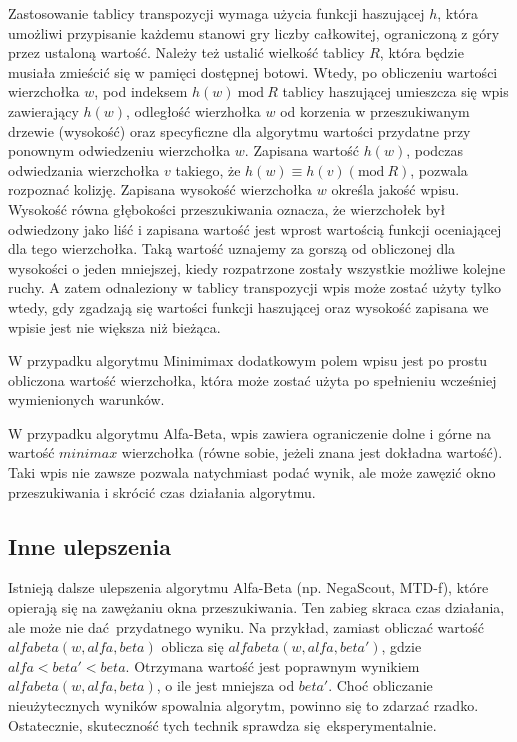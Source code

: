 \documentclass{pracamgr}
\begin{document}
Zastosowanie tablicy transpozycji wymaga użycia funkcji haszującej \(h\), która umożliwi przypisanie każdemu stanowi gry liczby całkowitej, ograniczoną z góry przez ustaloną wartość.
Należy też ustalić wielkość tablicy \(R\), która będzie musiała zmieścić się w pamięci dostępnej botowi.
Wtedy, po obliczeniu wartości wierzchołka \(w\), pod indeksem \(h(w)\ \textrm{mod}\ R\) tablicy haszującej umieszcza się wpis zawierający \(h(w)\), odległość wierzhołka \(w\) od korzenia w przeszukiwanym drzewie (wysokość) oraz specyficzne dla algorytmu wartości przydatne przy ponownym odwiedzeniu wierzchołka \(w\).
Zapisana wartość \(h(w)\), podczas odwiedzania wierzchołka \(v\) takiego, że \(h(w) \equiv h(v) (\textrm{mod}\ R)\), pozwala rozpoznać kolizję.
Zapisana wysokość wierzchołka \(w\) określa jakość wpisu.
Wysokość równa głębokości przeszukiwania oznacza, że wierzchołek był odwiedzony jako liść i zapisana wartość jest wprost wartością funkcji oceniającej dla tego wierzchołka.
Taką wartość uznajemy za gorszą od obliczonej dla wysokości o jeden mniejszej, kiedy rozpatrzone zostały wszystkie możliwe kolejne ruchy.
A zatem odnaleziony w tablicy transpozycji wpis może zostać użyty tylko wtedy, gdy zgadzają się wartości funkcji haszującej oraz wysokość zapisana we wpisie jest nie większa niż bieżąca.

W przypadku algorytmu Minimimax dodatkowym polem wpisu jest po prostu obliczona wartość wierzchołka, która może zostać użyta po spełnieniu wcześniej wymienionych warunków.

W przypadku algorytmu Alfa-Beta, wpis zawiera ograniczenie dolne i górne na wartość \(minimax\) wierzchołka (równe sobie, jeżeli znana jest dokładna wartość).
Taki wpis nie zawsze pozwala natychmiast podać wynik, ale może zawęzić okno przeszukiwania i skrócić czas działania algorytmu.

\subsection{Inne ulepszenia}

Istnieją dalsze ulepszenia algorytmu Alfa-Beta (np. NegaScout, MTD-f), które opierają się na zawężaniu okna przeszukiwania.
Ten zabieg skraca czas działania, ale może nie dać przydatnego wyniku.
Na przykład, zamiast obliczać wartość \(alfabeta(w, alfa, beta)\) oblicza się \(alfabeta(w, alfa, beta')\), gdzie \(alfa < beta' < beta\).
Otrzymana wartość jest poprawnym wynikiem \(alfabeta(w, alfa, beta)\), o ile jest mniejsza od \(beta'\).
Choć obliczanie nieużytecznych wyników spowalnia algorytm, powinno się to zdarzać rzadko.
Ostatecznie, skuteczność tych technik sprawdza się eksperymentalnie.
\end{document}
